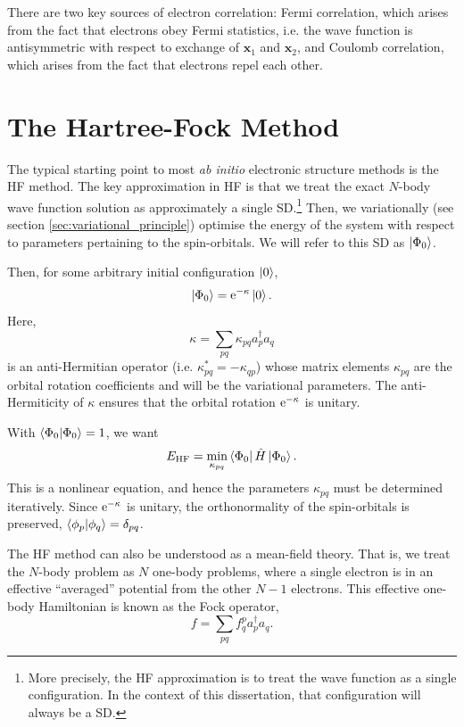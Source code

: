 There are two key sources of electron correlation: Fermi correlation, which arises from the fact that electrons obey Fermi statistics, i.e. the wave function is antisymmetric with respect to exchange of $\bm x_1$ and $\bm x_2$, and Coulomb correlation, which arises from the fact that electrons repel each other.

\section{The Hartree-Fock Method}
\label{sec:hf}

The typical starting point to most \emph{ab initio} electronic structure methods is the \gls{HF} method.\cite{hartreeWave1928,fockNaherungsmethode1930,slaterNote1930} The key approximation in \gls{HF} is that we treat the exact $N$-body wave function solution as approximately a single \gls{SD}.\footnote{More precisely, the \gls{HF} approximation is to treat the wave function as a single configuration. In the context of this dissertation, that configuration will always be a \gls{SD}.} Then, we variationally (see section \ref{sec:variational_principle}) optimise the energy of the system with respect to parameters pertaining to the spin-orbitals. We will refer to this \gls{SD} as $\ket{\Phi_0}$.

Then, for some arbitrary initial configuration $\ket 0$,
\begin{equation}
\ket{\Phi_0} = \mathrm{e}^{-\kappa} \ket 0.
\end{equation}
Here,
\begin{equation}
\kappa = \sum_{pq} \kappa_{pq}a_p^\dag a_q
\end{equation}
is an anti-Hermitian operator (i.e. $\kappa_{pq}^* = -\kappa_{qp}$) whose matrix elements $\kappa_{pq}$ are the orbital rotation coefficients and will be the variational parameters. The anti-Hermiticity of $\kappa$ ensures that the orbital rotation $\mathrm{e}^{-\kappa}$ is unitary.

With $\braket{\Phi_0}=1$, we want
\begin{equation}
E_\mathrm{HF} = \min_{\kappa_{pq}}\bra{\Phi_0}\hat H\ket{\Phi_0}.
\end{equation}
This is a nonlinear equation, and hence the parameters $\kappa_{pq}$ must be determined iteratively. Since $\mathrm{e}^{-\kappa}$ is unitary, the orthonormality of the spin-orbitals is preserved, $\bra{\phi_p}\ket{\phi_q} = \delta_{pq}$.

The \gls{HF} method can also be understood as a mean-field theory. That is, we treat the $N$-body problem as $N$ one-body problems, where a single electron is in an effective ``averaged'' potential from the other $N-1$ electrons. This effective one-body Hamiltonian is known as the Fock operator,
\begin{equation}
    \label{eq:fock-operator}
    f = \sum_{pq} f^p_{q} a_p^\dag a_q.
\end{equation}

